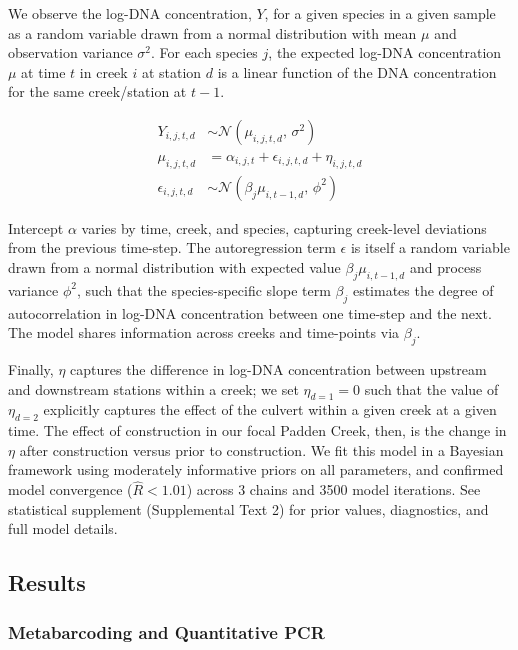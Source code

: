 \documentclass[
]{article}
\begin{document}
We observe the log-DNA concentration, \(Y\), for a given species in a
given sample as a random variable drawn from a normal distribution with
mean \(\mu\) and observation variance \(\sigma^2\). For each species
\(j\), the expected log-DNA concentration \(\mu\) at time \(t\) in creek
\(i\) at station \(d\) is a linear function of the DNA concentration for
the same creek/station at \(t-1\).

\begin{align*}\label{eqn:ts}
Y_{i,j,t,d} &\sim \mathcal{N}(\mu_{i,j,t,d},\,\sigma^{2})\\
\mu_{i,j,t,d} &= \alpha_{i,j,t} + \epsilon_{i,j,t,d} + \eta_{i,j,t,d}\\
\epsilon_{i,j,t,d} &\sim \mathcal{N}(\beta_{j}\mu_{i,t-1,d},\, \phi^2)
\end{align*}

Intercept \(\alpha\) varies by time, creek, and species, capturing
creek-level deviations from the previous time-step. The autoregression
term \(\epsilon\) is itself a random variable drawn from a normal
distribution with expected value \(\beta_{j}\mu_{i,t-1,d}\) and process
variance \(\phi^2\), such that the species-specific slope term
\(\beta_{j}\) estimates the degree of autocorrelation in log-DNA
concentration between one time-step and the next. The model shares
information across creeks and time-points via \(\beta_{j}\).

Finally, \(\eta\) captures the difference in log-DNA concentration
between upstream and downstream stations within a creek; we set
\(\eta_{d = 1} = 0\) such that the value of \(\eta_{d = 2}\) explicitly
captures the effect of the culvert within a given creek at a given time.
The effect of construction in our focal Padden Creek, then, is the
change in \(\eta\) after construction versus prior to construction. We
fit this model in a Bayesian framework using moderately informative
priors on all parameters, and confirmed model convergence
(\(\hat{R} < 1.01\)) across 3 chains and 3500 model iterations. See
statistical supplement (Supplemental Text 2) for prior values,
diagnostics, and full model details.

\hypertarget{results}{%
\subsection{Results}\label{results}}

\hypertarget{metabarcoding-and-quantitative-pcr}{%
\subsubsection{Metabarcoding and Quantitative
PCR}\label{metabarcoding-and-quantitative-pcr}}
\end{document}
